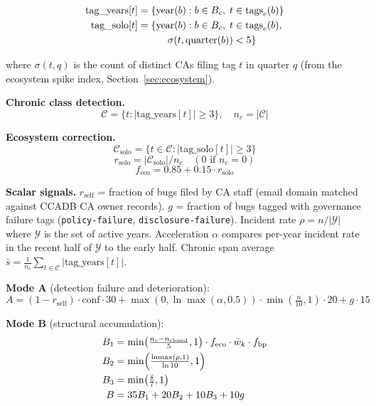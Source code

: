 \documentclass[10pt,twocolumn,letterpaper]{article}
\begin{document}
\begin{align}
\text{tag\_years}[t] &= \{\text{year}(b) : b \in B_c,\; t \in \text{tags}_c(b)\} \notag \\
\text{tag\_solo}[t] &= \{\text{year}(b) : b \in B_c,\; t \in \text{tags}_c(b), \notag \\
   &\quad\quad\quad \sigma(t, \text{quarter}(b)) < 5\} \notag
\end{align}

where $\sigma(t, q)$ is the count of distinct CAs filing tag $t$ in quarter $q$
(from the ecosystem spike index, Section~\ref{sec:ecosystem}).

\textbf{Chronic class detection.}
\[
\mathcal{C} = \{t : |\text{tag\_years}[t]| \geq 3\}, \quad n_c = |\mathcal{C}|
\]

\textbf{Ecosystem correction.}
\[
\mathcal{C}_{\text{solo}} = \{t \in \mathcal{C} : |\text{tag\_solo}[t]| \geq 3\}
\]
\[
r_{\text{solo}} = |\mathcal{C}_{\text{solo}}| / n_c \quad (0 \text{ if } n_c = 0)
\]
\[
f_{\text{eco}} = 0.85 + 0.15 \cdot r_{\text{solo}}
\]

\textbf{Scalar signals.} $r_{\text{self}}$ = fraction of bugs filed by CA staff
(email domain matched against CCADB CA owner records). $g$ = fraction of bugs
tagged with governance failure tags (\texttt{policy-failure}, \texttt{disclosure-failure}).
Incident rate $\rho = n / |\mathcal{Y}|$ where $\mathcal{Y}$ is the set of active
years. Acceleration $\alpha$ compares per-year incident rate in the recent half of
$\mathcal{Y}$ to the early half. Chronic span average
$\bar{s} = \frac{1}{n_c}\sum_{t \in \mathcal{C}} |\text{tag\_years}[t]|$.

\textbf{Mode A} (detection failure and deterioration):
\[
A = (1 - r_{\text{self}}) \cdot \text{conf} \cdot 30 + \max(0, \ln\!\max(\alpha, 0.5)) \cdot \min\!\left(\tfrac{n}{10}, 1\right) \cdot 20 + g \cdot 15
\]

\textbf{Mode B} (structural accumulation):
\begin{align}
B_1 &= \min\!\left(\tfrac{n_c - n_{\text{closed}}}{5}, 1\right) \cdot f_{\text{eco}} \cdot \bar{w}_k \cdot f_{\text{bp}} \notag \\
B_2 &= \min\!\left(\tfrac{\ln\!\max(\rho, 1)}{\ln 10}, 1\right) \notag \\
B_3 &= \min\!\left(\tfrac{\bar{s}}{7}, 1\right) \notag \\
B   &= 35 B_1 + 20 B_2 + 10 B_3 + 10 g \notag
\end{align}
\end{document}

